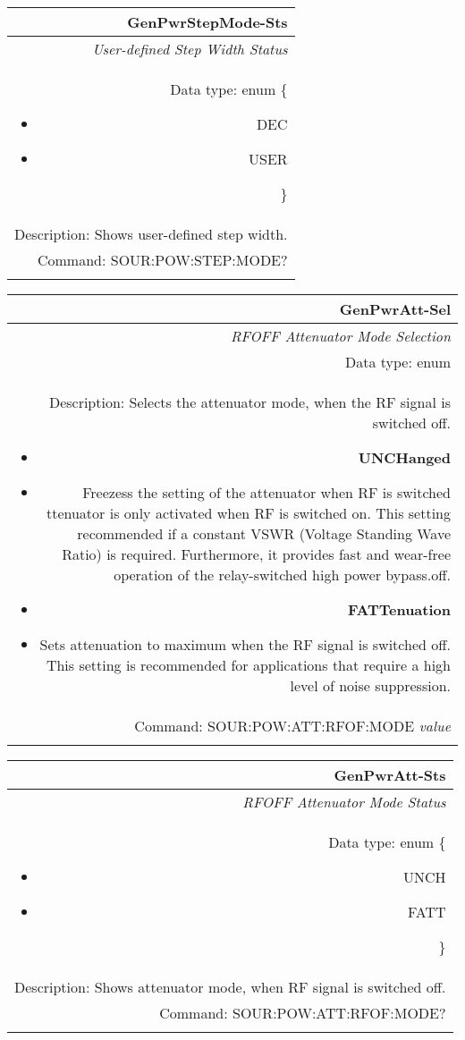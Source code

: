 \documentclass[openany]{article}
\begin{document}
		\begin{tabular}{N}
			\hline
			\bfseries GenPwrStepMode-Sts \\ \hline
			\emph{User-defined Step Width Status} \\
			Data type: enum \{\begin{itemize}[noitemsep]
				\small
				\item[] DEC
				\item[] USER
			\end{itemize}\} \\
			Description: Shows user-defined step width. \\
			Command: SOUR:POW:STEP:MODE? \\
			\\

		\end{tabular}


		\begin{tabular}{N}
			\hline
			\bfseries GenPwrAtt-Sel  \\ \hline
			\emph{RFOFF Attenuator Mode Selection} \\
			Data type: enum \\
			Description: Selects the attenuator mode, when the RF signal is switched off. \begin{itemize}[noitemsep]
				\small
				\item[] \textbf{UNCHanged}
				\item[] Freezess the setting of the attenuator when RF is switched ttenuator is only activated when RF is switched on. This setting recommended if a constant VSWR (Voltage Standing Wave Ratio) is required. Furthermore, it provides fast and wear-free operation of the relay-switched high power bypass.off.
				\item[] \textbf{FATTenuation}
				\item[] Sets attenuation to maximum when the RF signal is switched off. This setting is recommended for applications that require a high level of noise suppression.
			\end{itemize} \\
			Command: SOUR:POW:ATT:RFOF:MODE \emph{value} \\
			\\ 

		\end{tabular}


		\begin{tabular}{N}
			\hline
			\bfseries GenPwrAtt-Sts \\ \hline
			\emph{RFOFF Attenuator Mode Status} \\
			Data type: enum \{\begin{itemize}[noitemsep]
				\small
				\item[] UNCH
				\item[] FATT
			\end{itemize}\} \\
			Description: Shows attenuator mode, when RF signal is switched off. \\
			Command: SOUR:POW:ATT:RFOF:MODE? \\
			\\

		\end{tabular}
\end{document}
